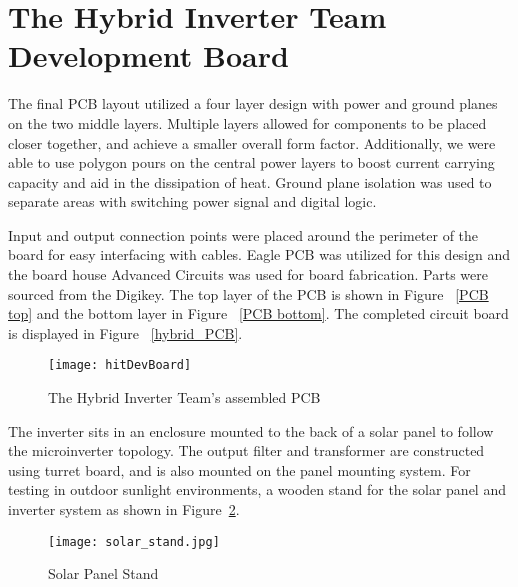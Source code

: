 \section{The Hybrid Inverter Team Development Board}
The final PCB layout utilized a four layer design with power and ground planes on the two middle layers. Multiple layers allowed for components to be placed closer together, and achieve a smaller overall form factor. Additionally, we were able to use polygon pours on the central power layers to boost current carrying capacity and aid in the dissipation of heat. Ground plane isolation was used to separate areas with switching power signal and digital logic.

Input and output connection points were placed around the perimeter of the board for easy interfacing with cables. Eagle PCB was utilized for this design and the board house Advanced Circuits was used for board fabrication. Parts were sourced from the Digikey. The top layer of the PCB is shown in Figure ~\ref{PCB top} and the bottom layer in Figure ~\ref{PCB bottom}. The completed circuit board is displayed in Figure ~\ref{hybrid_PCB}. 

\begin{figure}
\centering
\texttt{[image: hitDevBoard]}
\caption{The Hybrid Inverter Team's assembled PCB}
\label{The Hybrid Inverter Team's assembled PCB}
\end{figure}


The inverter sits in an enclosure mounted to the back of a solar panel to follow the microinverter topology. The output filter and transformer are constructed using turret board, and is also mounted on the panel mounting system. For testing in outdoor sunlight environments, a wooden stand for the solar panel and inverter system as shown in Figure~\ref{solar stand}.

\begin{figure}
\centering
\texttt{[image: solar\_stand.jpg]}
\caption{Solar Panel Stand}
\label{solar stand}
\end{figure}





